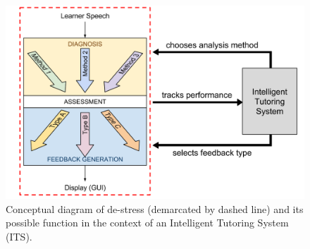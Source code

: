 \documentclass[a0,portrait]{a0poster}
\newcommand{\headingcolor}{\color{BannerSixColor}}
\def\Highlight#1{{\sffamily \headingcolor #1}}
\begin{document}
\begin{textblock}{7}
	\begin{figure}
	\centering
	\includegraphics[width=\textwidth]{../../../colloquium/hourglass-colloq-full}
	\caption{Conceptual diagram of \Highlight{de-stress} (demarcated by dashed line) and its possible function in the context of an Intelligent Tutoring System (ITS).}
	\label{fig:hourglass-ITS}
	\end{figure}
 
\end{textblock}


\end{document}
